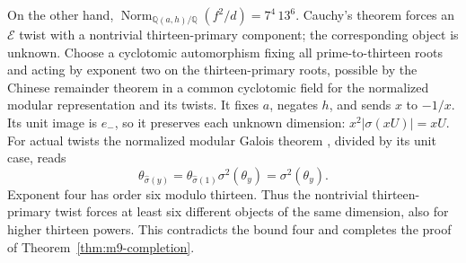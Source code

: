 On the other hand,
$\operatorname{Norm}_{\mathbb Q(a,h)/\mathbb Q}(f^2/d)=7^4\,13^6$.
Cauchy's theorem forces an $\mathcal E$ twist with a nontrivial
thirteen-primary component; the corresponding object is unknown.
Choose a cyclotomic automorphism fixing all prime-to-thirteen roots
and acting by exponent two on the thirteen-primary roots, possible by
the Chinese remainder theorem in a common cyclotomic field for the
normalized modular representation and its twists.
It fixes $a$, negates $h$, and sends $x$ to $-1/x$.
Its unit image is $e_-$, so it preserves each unknown dimension:
$x^2|\sigma(xU)|=xU$.
For actual twists the normalized modular Galois theorem
\cite[Theorem~II(iii)]{DLN}, divided by its unit case, reads
\[
 \theta_{\widehat\sigma(y)}
 =\theta_{\widehat\sigma(1)}\sigma^2(\theta_y)
 =\sigma^2(\theta_y).
\]
Exponent four has order six modulo thirteen. Thus the nontrivial
thirteen-primary twist forces at least six different objects of the
same dimension, also for higher thirteen powers. This contradicts
the bound four and completes the proof of
Theorem~\ref{thm:m9-completion}.
